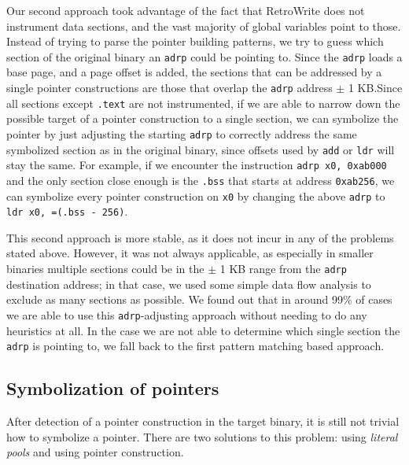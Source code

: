 \documentclass[a4paper,11pt,oneside]{report}
\newcommand{\sysname}{RetroWrite\xspace}
\DeclareRobustCommand{\mat}[1]{{\sethlcolor{red}\hl{MAT: #1}}}
\begin{document}
Our second approach took advantage of the fact that \sysname does not 
instrument data sections, and the vast majority of global variables point to
those. Instead of trying to parse the pointer building patterns, we try to
guess which section of the original binary an \texttt{adrp} could be pointing
to. Since the \texttt{adrp} loads a base page, and a page offset is added, the
sections that can be addressed by a single pointer constructions are those that
overlap the \texttt{adrp} address $\pm$ 1 KB.\@ Since all sections except
\texttt{.text} are not instrumented, if we are able to narrow down the possible
target of a pointer construction to a single section, we can symbolize the
pointer by just adjusting the starting 
\texttt{adrp} to correctly address the same symbolized section as in the 
original binary, since offsets used by \texttt{add} or \texttt{ldr} will stay 
the same.
For example, if we encounter the instruction \texttt{adrp x0, 0xab000} and the
only section close enough is the \texttt{.bss} that starts at address
\texttt{0xab256}, we can symbolize every pointer construction on \texttt{x0} by
changing the above \texttt{adrp} to \texttt{ldr x0, =(.bss - 256)}.



This second approach is more stable, as it does not
incur in any of the problems stated above. However, it was not always
applicable, as especially in smaller binaries multiple sections could be in the
$\pm$ 1 KB range from the \texttt{adrp} destination address; in that case, we
used some simple data flow analysis to exclude as many sections as possible.
We found out that in around 99\% of cases we are able to use this \texttt{adrp}-adjusting
approach without needing to do any heuristics at all. In the case we are not able
to determine which single section the \texttt{adrp} is pointing to, we fall back
to the first pattern matching based approach. 


\subsection{Symbolization of pointers}

After detection of a pointer construction in the target binary, it is still not 
trivial how to symbolize a pointer. There are two solutions to this problem: 
using \emph{literal pools} and using pointer construction.
\end{document}
